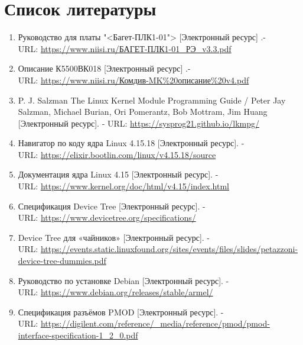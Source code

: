 \chapter*{Список литературы}

\begin{enumerate}
	\item Руководство для платы "<Багет-ПЛК1-01"> [Электронный ресурс] .- \\
	URL: \href{https://www.niisi.ru/%D0%91%D0%90%D0%93%D0%95%D0%A2-%D0%9F%D0%9B%D0%9A1-01_%D0%A0%D0%AD_v3.3.pdf}{https://www.niisi.ru/БАГЕТ-ПЛК1-01\_РЭ\_v3.3.pdf}
	
	\item Описание К5500ВК018 [Электронный ресурс] .- \\
	URL: \href{https://www.niisi.ru/%D0%9A%D0%BE%D0%BC%D0%B4%D0%B8%D0%B2-%D0%9C%D0%9A%20%D0%BE%D0%BF%D0%B8%D1%81%D0%B0%D0%BD%D0%B8%D0%B5%20v4.pdf}{https://www.niisi.ru/Комдив-MK\%20описание\%20v4.pdf}
	
	\item P. J. Salzman The Linux Kernel Module Programming Guide / Peter Jay Salzman, Michael Burian, Ori Pomerantz, Bob Mottram, Jim Huang [Электронный ресурс]. - URL: \href {https://sysprog21.github.io/lkmpg/}{https://sysprog21.github.io/lkmpg/}
	
	\item Навигатор по коду ядра Linux 4.15.18 [Электронный ресурс]. - \\
	URL: \href{https://elixir.bootlin.com/linux/v4.15.18/source}{https://elixir.bootlin.com/linux/v4.15.18/source}
	
	\item Документация ядра Linux 4.15 [Электронный ресурс]. - \\ 
	URL: \href{https://www.kernel.org/doc/html/v4.15/index.html}{https://www.kernel.org/doc/html/v4.15/index.html}
	
	\item  Спецификация Device Tree [Электронный ресурс]. - \\
	URL: \href{https://www.devicetree.org/specifications/}{https://www.devicetree.org/specifications/}
	
	\item Device Tree для «чайников» [Электронный ресурс]. - \\
	URL: \href{https://events.static.linuxfound.org/sites/events/files/slides/petazzoni-device-tree-dummies.pdf}{https://events.static.linuxfound.org/sites/events/files/slides/petazzoni-device-tree-dummies.pdf}
	
	\item  Руководство по установке Debian [Электронный ресурс]. - \\
	URL: \href{https://www.debian.org/releases/stable/armel/}{https://www.debian.org/releases/stable/armel/}
	
	\item  Спецификация разъёмов PMOD [Электронный ресурс]. - \\
	URL: \href{https://digilent.com/reference/\_media/reference/pmod/pmod-interface-specification-1\_2\_0.pdf}{https://digilent.com/reference/\_media/reference/pmod/pmod-interface-specification-1\_2\_0.pdf}
\end{enumerate}